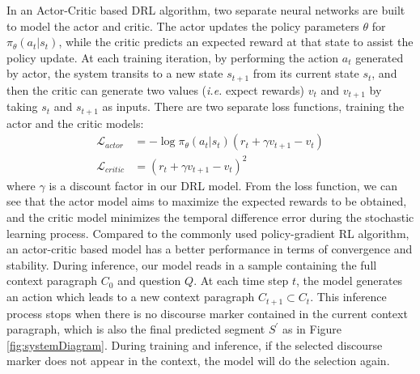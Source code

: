 

In an Actor-Critic based DRL algorithm, two separate neural networks are built to model the actor and critic. The actor updates the policy parameters $\theta$ for $\pi_\theta(a_t|s_t)$, while the critic predicts an expected reward at that state to assist the policy update. %
At each training iteration, by performing the action $a_t$ generated by actor, the system transits to a new state $s_{t+1}$ from its current state $s_t$, and then the critic  can generate two values (\emph{i.e.} expect rewards) $v_t$ and $v_{t+1}$ by taking $s_t$ and $s_{t+1}$ as inputs. There are two separate loss functions, training the actor and the critic models:
\begin{equation}
\begin{split}
\mathcal{L}_{actor}&=-\log \pi_{\theta} (a_t|s_t)(r_t+\gamma v_{t+1}-v_{t})\\
\mathcal{L}_{critic}&=(r_t+\gamma v_{t+1}-v_{t})^2
\label{rlloss}
\end{split}
\end{equation}
where $\gamma$ is a discount factor in our DRL model. From the loss function, we can see that the actor model aims to maximize the expected rewards to be obtained, and the critic model minimizes the temporal difference error during the stochastic learning process. Compared to the commonly used policy-gradient RL algorithm, an actor-critic based model has a better performance in terms of convergence and stability. During inference, our model reads in a sample containing the full context paragraph $C_0$ and question $Q$. At each time step $t$, the model generates an action which leads to a new context paragraph $C_{t+1}\subset C_t$. This inference process stops when there is no discourse marker contained in the current context paragraph, which is also the final predicted segment $S^{\prime}$ as in Figure \ref{fig:systemDiagram}. During training and inference, if the selected discourse marker does not appear in the context, the model will do the selection again.